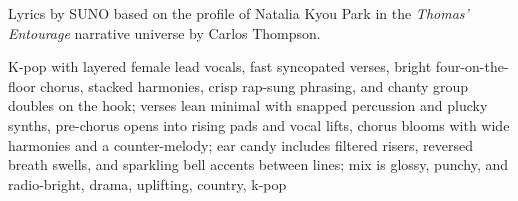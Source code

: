 
\begin{notes}
Lyrics by SUNO based on the profile of Natalia Kyou Park in the \emph{Thomas’ Entourage} narrative universe by Carlos Thompson.
\end{notes}
\begin{style}
K-pop with layered female lead vocals, fast syncopated verses, bright four-on-the-floor chorus, stacked harmonies, crisp rap-sung phrasing, and chanty group doubles on the hook; verses lean minimal with snapped percussion and plucky synths, pre-chorus opens into rising pads and vocal lifts, chorus blooms with wide harmonies and a counter-melody; ear candy includes filtered risers, reversed breath swells, and sparkling bell accents between lines; mix is glossy, punchy, and radio-bright, drama, uplifting, country, k-pop
\end{style}
